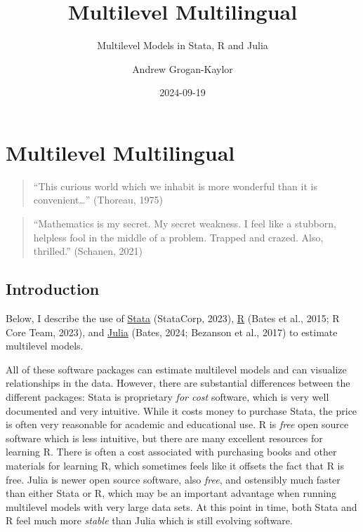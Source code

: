 \documentclass[
  letterpaper,
  DIV=11,
  numbers=noendperiod]{scrreprt}
\title{Multilevel Multilingual}
\subtitle{Multilevel Models in Stata, R and Julia}
\author{Andrew Grogan-Kaylor}
\date{2024-09-19}
\renewcommand*\contentsname{Table of contents}
\newcommand\contentsname{Table of contents}
\begin{document}
\maketitle

\renewcommand*\contentsname{Table of contents}
{
\hypersetup{linkcolor=}
\setcounter{tocdepth}{2}
\tableofcontents
}
\listoftables
{}

\chapter{Multilevel Multilingual}\label{multilevel-multilingual}

\begin{quote}
``This curious world which we inhabit is more wonderful than it is
convenient\ldots{}'' (Thoreau, 1975)
\end{quote}

\begin{quote}
``Mathematics is my secret. My secret weakness. I feel like a stubborn,
helpless fool in the middle of a problem. Trapped and crazed. Also,
thrilled.'' (Schanen, 2021)
\end{quote}

\section{Introduction}\label{introduction}

Below, I describe the use of \href{https://www.stata.com/}{Stata}
(StataCorp, 2023), \href{https://www.r-project.org/}{R} (Bates et al.,
2015; R Core Team, 2023), and \href{https://www.julialang.org/}{Julia}
(Bates, 2024; Bezanson et al., 2017) to estimate multilevel models.

All of these software packages can estimate multilevel models and can
visualize relationships in the data. However, there are substantial
differences between the different packages: Stata is proprietary
\emph{for cost} software, which is very well documented and very
intuitive. While it costs money to purchase Stata, the price is often
very reasonable for academic and educational use. R is \emph{free} open
source software which is less intuitive, but there are many excellent
resources for learning R. There is often a cost associated with
purchasing books and other materials for learning R, which sometimes
feels like it offsets the fact that R is free. Julia is newer open
source software, also \emph{free}, and ostensibly much faster than
either Stata or R, which may be an important advantage when running
multilevel models with very large data sets. At this point in time, both
Stata and R feel much more \emph{stable} than Julia which is still
evolving software.
\end{document}
